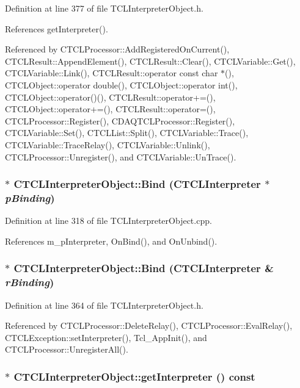 Definition at line 377 of file TCLInterpreter\-Object.h.

References get\-Interpreter().

Referenced by CTCLProcessor::Add\-Registered\-On\-Current(), CTCLResult::Append\-Element(), CTCLResult::Clear(), CTCLVariable::Get(), CTCLVariable::Link(), CTCLResult::operator const char $\ast$(), CTCLObject::operator double(), CTCLObject::operator int(), CTCLObject::operator()(), CTCLResult::operator+=(), CTCLObject::operator+=(), CTCLResult::operator=(), CTCLProcessor::Register(), CDAQTCLProcessor::Register(), CTCLVariable::Set(), CTCLList::Split(), CTCLVariable::Trace(), CTCLVariable::Trace\-Relay(), CTCLVariable::Unlink(), CTCLProcessor::Unregister(), and CTCLVariable::Un\-Trace().
\subsubsection{ $\ast$ CTCLInterpreter\-Object::Bind ({\bf CTCLInterpreter} $\ast$ {\em p\-Binding})}\label{classCTCLInterpreterObject_a8}




Definition at line 318 of file TCLInterpreter\-Object.cpp.

References m\_\-p\-Interpreter, On\-Bind(), and On\-Unbind().
\subsubsection{$\ast$ CTCLInterpreter\-Object::Bind ({\bf CTCLInterpreter} \& {\em r\-Binding})\hspace{0.3cm}{\tt  [inline]}}\label{classCTCLInterpreterObject_a7}




Definition at line 364 of file TCLInterpreter\-Object.h.

Referenced by CTCLProcessor::Delete\-Relay(), CTCLProcessor::Eval\-Relay(), CTCLException::set\-Interpreter(), Tcl\_\-App\-Init(), and CTCLProcessor::Unregister\-All().
\subsubsection{$\ast$ CTCLInterpreter\-Object::get\-Interpreter () const\hspace{0.3cm}{\tt  [inline]}}\label{classCTCLInterpreterObject_a6}




